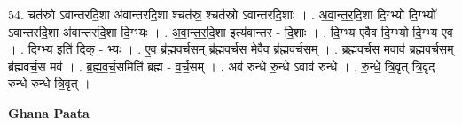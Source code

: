 \documentclass[17pt]{extarticle}
\begin{document}
54. चत॑स्रो ऽवान्तरदि॒शा अ॑वान्तरदि॒शा श्चत॑स्र॒ श्चत॑स्रो ऽवान्तरदि॒शाः । . अ॒वा॒न्त॒र॒दि॒शा दि॒ग्भ्यो दि॒ग्भ्यो॑ ऽवान्तरदि॒शा अ॑वान्तरदि॒शा दि॒ग्भ्यः । . अ॒वा॒न्त॒र॒दि॒शा इत्य॑वान्तर - दि॒शाः । . दि॒ग्भ्य ए॒वैव दि॒ग्भ्यो दि॒ग्भ्य ए॒व । . दि॒ग्भ्य इति॑ दिक् - भ्यः । . ए॒व ब्र॑ह्मवर्च॒सम् ब्र॑ह्मवर्च॒स मे॒वैव ब्र॑ह्मवर्च॒सम् । . ब्र॒ह्म॒व॒र्च॒स मवाव॑ ब्रह्मवर्च॒सम् ब्र॑ह्मवर्च॒स मव॑ । . ब्र॒ह्म॒व॒र्च॒समिति॑ ब्रह्म - व॒र्च॒सम् । . अव॑ रुन्धे रु॒न्धे ऽवाव॑ रुन्धे । . रु॒न्धे॒ त्रि॒वृत् त्रि॒वृद् रु॑न्धे रुन्धे त्रि॒वृत् । \newline

\textbf{Ghana Paata } \newline
\end{document}

